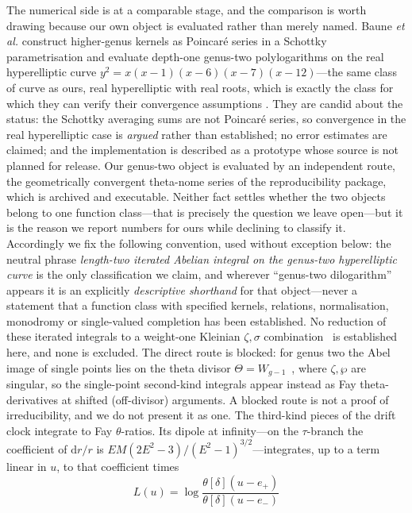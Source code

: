 \documentclass[12pt]{iopart}
\theoremstyle{plain}
\theoremstyle{definition}
\theoremstyle{remark}
\newcommand{\dd}{\mathrm{d}}
\begin{document}
The numerical side is at a comparable stage, and the comparison is worth drawing
because our own object is evaluated rather than merely named. Baune \emph{et al.}
construct higher-genus kernels as Poincar\'e series in a Schottky parametrisation
and evaluate depth-one genus-two polylogarithms on the real hyperelliptic curve
$y^2=x(x-1)(x-6)(x-7)(x-12)$---the same class of curve as ours, real hyperelliptic
with real roots, which is exactly the class for which they can verify their
convergence assumptions \cite[\S\S6.1--6.3]{BauneEtal2024}. They are candid about
the status: the Schottky averaging sums are not Poincar\'e series, so convergence
in the real hyperelliptic case is \emph{argued} rather than established; no error
estimates are claimed; and the implementation is described as a prototype whose
source is not planned for release. Our genus-two object is evaluated by an
independent route, the geometrically convergent theta-nome series of the
reproducibility package, which is archived and executable. Neither fact settles
whether the two objects belong to one function class---that is precisely the
question we leave open---but it is the reason we report numbers for ours while
declining to classify it. Accordingly we fix the
following convention, used without exception below: the neutral phrase
\emph{length-two iterated Abelian integral on the genus-two hyperelliptic curve} is the
only classification we claim, and wherever ``genus-two dilogarithm'' appears it is an
explicitly \emph{descriptive shorthand} for that object---never a statement that a
function class with specified kernels, relations, normalisation, monodromy or
single-valued completion has been established. No reduction of these
iterated integrals to a weight-one Kleinian $\zeta,\sigma$
combination~\cite{BakerAbelian1897,BuchstaberEnolskii1997} is established here, and
none is excluded. The direct route is blocked: for genus two the Abel image of single
points lies on the theta divisor $\Theta=W_{g-1}$~\cite{MumfordTata}, where
$\zeta,\wp$ are singular, so the single-point second-kind integrals appear instead as
Fay theta-derivatives at shifted (off-divisor) arguments. A blocked route is not a
proof of irreducibility, and we do not present it as one. The third-kind pieces of
the drift clock integrate to Fay $\theta$-ratios. Its dipole at infinity---on the
$\tau$-branch the coefficient of $\dd r/r$ is $EM(2E^2-3)/(E^2-1)^{3/2}$---integrates,
up to a term linear in $u$, to that coefficient times
\begin{equation}
    L(u)=\log\frac{\theta[\delta](u-e_+)}{\theta[\delta](u-e_-)}
    \label{eq:thirdkind-theta}
\end{equation}
\end{document}
